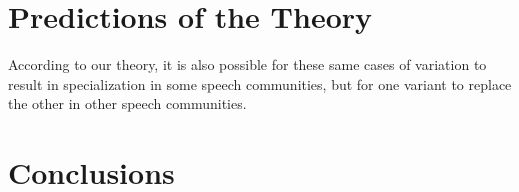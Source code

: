 \section{Predictions of the Theory}

According to our theory, it is also possible for these same cases of variation to result in specialization in some speech communities, but for one variant to replace the other in other speech communities.

\section{Conclusions}















